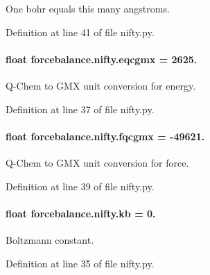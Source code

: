 One bohr equals this many angstroms. 



Definition at line 41 of file nifty.\-py.

\hypertarget{namespaceforcebalance_1_1nifty_a7cec4d46378b888cd867de05d0168d96}{
\paragraph[{eqcgmx}]{\setlength{\rightskip}{0pt plus 5cm}float forcebalance.\-nifty.\-eqcgmx = 2625.}}\label{namespaceforcebalance_1_1nifty_a7cec4d46378b888cd867de05d0168d96}


Q-\/\-Chem to G\-M\-X unit conversion for energy. 



Definition at line 37 of file nifty.\-py.

\hypertarget{namespaceforcebalance_1_1nifty_ab1ec21beaae0d8328e7e4c3b89d972ab}{
\paragraph[{fqcgmx}]{\setlength{\rightskip}{0pt plus 5cm}float forcebalance.\-nifty.\-fqcgmx = -\/49621.}}\label{namespaceforcebalance_1_1nifty_ab1ec21beaae0d8328e7e4c3b89d972ab}


Q-\/\-Chem to G\-M\-X unit conversion for force. 



Definition at line 39 of file nifty.\-py.

\hypertarget{namespaceforcebalance_1_1nifty_ae0916a3186f4f8b238a0d58bb9f6a3da}{
\paragraph[{kb}]{\setlength{\rightskip}{0pt plus 5cm}float forcebalance.\-nifty.\-kb = 0.}}\label{namespaceforcebalance_1_1nifty_ae0916a3186f4f8b238a0d58bb9f6a3da}


Boltzmann constant. 



Definition at line 35 of file nifty.\-py.

